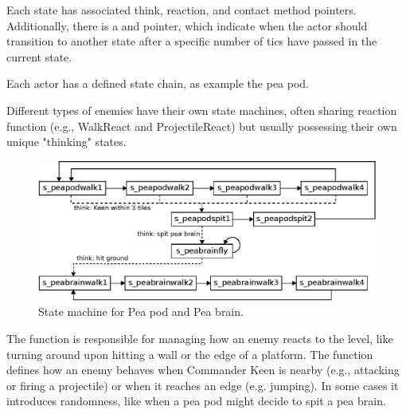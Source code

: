 \documentclass[book.tex]{subfiles}
\begin{document}
\par
Each state has associated think, reaction, and contact method pointers. Additionally, there is a  and  pointer, which indicate when the actor should transition to another state after a specific number of tics have passed in the current state.\\

\par
\begin{minipage}{\textwidth}
  
\end{minipage}
\label{state_type}
\par

Each actor has a defined state chain, as example the pea pod. \\
\par
\begin{minipage}{\textwidth}

\end{minipage}

\par
Different types of enemies have their own state machines, often sharing reaction function (e.g., WalkReact and ProjectileReact) but usually possessing their own unique "thinking" states.\\

\begin{figure}[H]
  \centering
  \includegraphics[width=\textwidth]{imgs/drawings/state_machine.eps}
  \caption{State machine for Pea pod and Pea brain.}
  \label{fig:state_machine}  
\end{figure}

\par
The  function is responsible for managing how an enemy reacts to the level, like turning around upon hitting a wall or the edge of a platform. The  function defines how an enemy behaves when Commander Keen is nearby (e.g., attacking or firing a projectile) or when it reaches an edge (e.g. jumping). In some cases it introduces randomness, like when a pea pod might decide to spit a pea brain.\\
\end{document}
